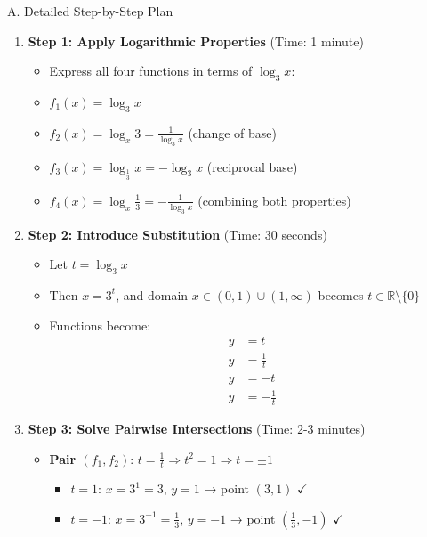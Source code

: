 \documentclass[12pt]{article}
\begin{document}
\begin{roadmapbox}{A. Detailed Step-by-Step Plan}
\begin{enumerate}[leftmargin=*]
    \item \textbf{Step 1: Apply Logarithmic Properties} (Time: 1 minute)
    \begin{itemize}
        \item Express all four functions in terms of $\log_3 x$:
        \item $f_1(x) = \log_3 x$
        \item $f_2(x) = \log_x 3 = \frac{1}{\log_3 x}$ (change of base)
        \item $f_3(x) = \log_{\frac{1}{3}} x = -\log_3 x$ (reciprocal base)
        \item $f_4(x) = \log_x \frac{1}{3} = -\frac{1}{\log_3 x}$ (combining both properties)
    \end{itemize}
    
    \item \textbf{Step 2: Introduce Substitution} (Time: 30 seconds)
    \begin{itemize}
        \item Let $t = \log_3 x$
        \item Then $x = 3^t$, and domain $x \in (0, 1) \cup (1, \infty)$ becomes $t \in \mathbb{R} \setminus \{0\}$
        \item Functions become:
        \begin{align*}
        y &= t \\
        y &= \frac{1}{t} \\
        y &= -t \\
        y &= -\frac{1}{t}
        \end{align*}
    \end{itemize}
    
    \item \textbf{Step 3: Solve Pairwise Intersections} (Time: 2-3 minutes)
    \begin{itemize}
        \item \textbf{Pair $(f_1, f_2)$}: $t = \frac{1}{t} \Rightarrow t^2 = 1 \Rightarrow t = \pm 1$
        \begin{itemize}
            \item $t = 1$: $x = 3^1 = 3$, $y = 1$ → point $(3, 1)$ $\checkmark$
            \item $t = -1$: $x = 3^{-1} = \frac{1}{3}$, $y = -1$ → point $(\frac{1}{3}, -1)$ $\checkmark$
        \end{itemize}
        

\end{itemize}
\end{enumerate}
\end{roadmapbox}
\end{document}
